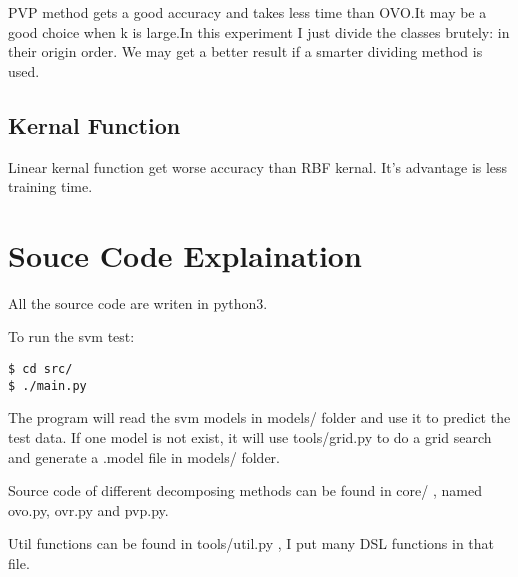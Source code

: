 \documentclass[11pt]{article}
\begin{document}
PVP method gets a good accuracy and takes less time than OVO.It may be a good choice when
k is large.In this experiment I just divide the classes brutely: in their origin order.
We may get a better result if a smarter dividing method is used.
\subsection{Kernal Function}
\label{sec-3-2}
Linear kernal function get worse accuracy than RBF kernal. It's advantage is less training
time.
\section{Souce Code Explaination}
\label{sec-4}
All the source code are writen in python3.

To run the svm test:
\begin{verbatim}
$ cd src/
$ ./main.py
\end{verbatim}

The program will read the svm models in models/ folder and use it to predict
the test data. If one model is not exist, it will use tools/grid.py to do a grid
search and generate a .model file in models/ folder.

Source code of different decomposing methods can be found in core/ , named
ovo.py, ovr.py and pvp.py.

Util functions can be found in tools/util.py , I put many DSL functions in that file.
\end{document}
